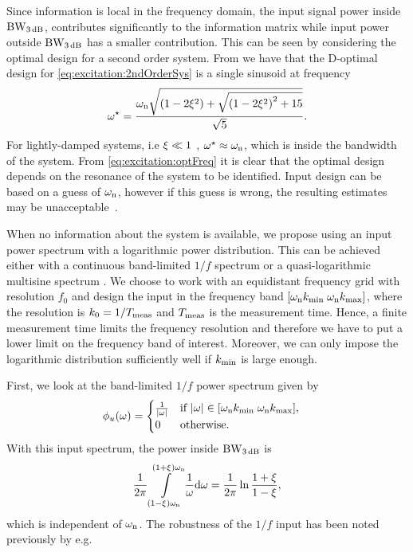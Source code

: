 Since information is local in the frequency domain, the input signal power inside $\mathrm{BW}_{3\,\mathrm{dB}}$, contributes significantly to the information matrix while input power outside $\mathrm{BW}_{3\,\mathrm{dB}}$ has a smaller contribution. This can be seen by considering the optimal design for a second order system. From \citep[Example 6.4.5]{Goodwin1977} we have that the D-optimal design for \eqref{eq:excitation:2ndOrderSys} is a single sinusoid at frequency
\begin{align}
\omega^\star =\frac%
{\wn
  \sqrt{
    \left(1-2\damping^2\right)
    +
    \sqrt{\left(1-2\damping^2\right)^2+15}
    }
  }
{\sqrt{5}}.
\label{eq:excitation:optFreq}
\end{align}
For lightly-damped systems, i.e $\xi_{} \ll 1$ , $\omega^\star\approx \omega_{\mathrm{n}}$, which is inside the bandwidth of the system. 
From \eqref{eq:excitation:optFreq} it is clear that the optimal design depends on the resonance of the system to be identified. 
Input design can be based on a guess of $\omega_{\mathrm{n}}$, however if this guess is wrong, the resulting estimates may be unacceptable~\citep{Rojas2007}.

When no information about the system is available, we propose using an input power spectrum with a logarithmic power distribution. This can be achieved either with a continuous band-limited $1/f$ spectrum or a quasi-logarithmic multisine spectrum \citep{Pintelon2012}. 
We choose to work with an equidistant frequency grid with resolution $f_0$ and design the input in the frequency band $[\omega_{\mathrm{n}} k_{\min}\; \omega_{\mathrm{n}} k_{\max}]$, where the resolution is $k_0=1/T_{\mathrm{meas}}$ and $T_{\mathrm{meas}}$ is the measurement time. 
Hence, a finite measurement time limits the frequency resolution and therefore we have to put a lower limit on the frequency band of interest. Moreover, we can only impose the logarithmic distribution sufficiently well if $k_{\min}$ is large enough.

First, we look at the band-limited $1/f$ power spectrum given by
\begin{align*}
\label{eq:excitation:pink}
\phi_u(\omega) &=\begin{cases}\frac{1}{|\omega|} &\text{if $|\omega|\in[\omega_{\mathrm{n}} k_{\min}\; \omega_{\mathrm{n}} k_{\max}]$,}\\
                        0           &\text{otherwise}.
            \end{cases}
\end{align*}
With this input spectrum, the power inside $\mathrm{BW}_{3\,\mathrm{dB}}$ is
\begin{align}
  \frac{1}{2\pi}
    \int\limits_{(1-\xi_{})\omega_{\mathrm{n}}}^{(1+\xi_{})\omega_{\mathrm{n}}}
     \frac{1}{\omega} \mathrm{d}{\omega}
  = \frac{1}{2\pi}
    \ln{\frac{1+\ensuremath{\xi_{}}}{1-\ensuremath{\xi_{}}}},
\end{align}
which is independent of $\omega_{\mathrm{n}}$. The robustness of the $1/f$ input has been noted previously by e.g. \cite{Rojas2007}

